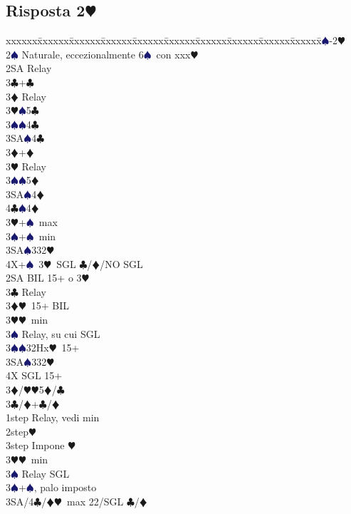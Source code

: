 \documentclass[a4paper,italian]{article}
\newcommand{\BC}{\textcolor{OliveGreen}{$\clubsuit$}}
\newcommand{\BD}{\textcolor{RedOrange}{$\vardiamondsuit$}}
\newcommand{\BH}{\textcolor{Red2}{$\varheartsuit${}}}
\newcommand{\BS}{\textcolor{MidnightBlue}{$\spadesuit${}}}
\newcommand{\pdfh}{\texorpdfstring{\BH{}}{H}}
\newenvironment{bidtable}
{\begin{tabbing}

    xxxxxx\=xxxxxx\=xxxxxx\=xxxxxx\=xxxxxx\=xxxxxx\=xxxxxx\=xxxxxx\=xxxxxx\=xxxxxx\=\kill}
{\end{tabbing} }%
\begin{document}
\begin{multicols}{2}

    \subsection{Risposta 2\pdfh}

    \begin{bidtable}
        1\BS-2\BH\+\\
        2\BS\> Naturale, eccezionalmente 6\BS\ con xxx\BH\+\\
        2SA \> Relay\+\\
        3\BC{}+\BC\+\\
        3\BD\> Relay\+\\
        3\BH{}\BS5\BC\\
        3\BS{}\BS4\BC\\
        3SA\BS4\BC\-\-\\
        3\BD{}+\BD\+\\
        3\BH\> Relay\+\\
        3\BS{}\BS5\BD\\
        3SA\BS4\BD\\
        4\BC{}\BS4\BD\-\-\\
        3\BH{}+\BS\ max\\
        3\BS{}+\BS\ min\\
        3SA\BS332\BH\\
        4X+\BS\ 3\BH\ SGL \BC/\BD/NO SGL\-\-\\
        2SA\> BIL 15+ o 3\BH\+\\
        3\BC\> Relay\+\\
        3\BD{}\BH\ 15+ BIL\\
        3\BH{}\BH\ min\+\\
        3\BS\> Relay, su cui SGL\-\\
        3\BS{}\BS32Hx\BH\ 15+\\
        3SA\BS332\BH\\
        4X\> SGL 15+\-\\
        3\BD/\BH{}\BH5\BD/\BC\-\\
        3\BC/\BD{}+\BC/\BD\+\\
        1step\> Relay, vedi min\\
        2step\BH\\
        3step\> Impone \BH\-\\
        3\BH{}\BH\ min\+\\
        3\BS\> Relay SGL\-\\
        3\BS{}+\BS, palo imposto\\
        3SA/4\BC/\BD\>\BH\ max 22/SGL \BC/\BD
    \end{bidtable}
    \vfill\null
    \columnbreak


\end{multicols}
\end{document}
